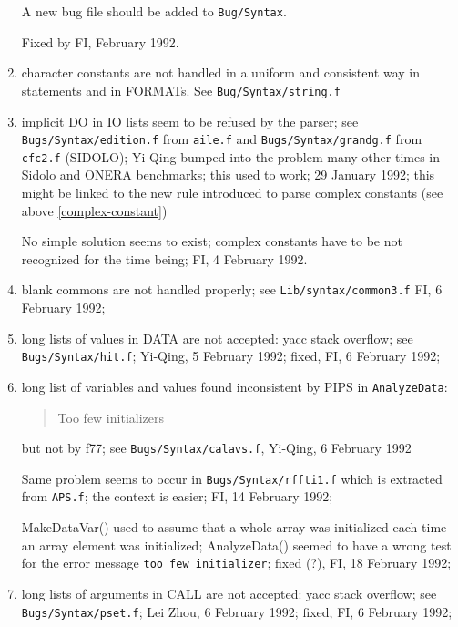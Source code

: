 \begin{enumerate}
        A new bug file should be added to \verb+Bug/Syntax+.

        Fixed by FI, February 1992.

  \item character constants are not handled in a uniform and consistent
        way in statements and in FORMATs. See \verb+Bug/Syntax/string.f+

  \item \label{implicit-do}
        implicit DO in IO lists seem to be refused by the parser; see
        \verb+Bugs/Syntax/edition.f+ from \verb+aile.f+ and
        \verb+Bugs/Syntax/grandg.f+ from \verb+cfc2.f+ (SIDOLO);
        Yi-Qing bumped into the problem many other times in Sidolo
        and ONERA benchmarks; this used to work; 29 January 1992;
        this might be linked to the new rule introduced to parse
        complex constants (see above \ref{complex-constant})

        No simple solution seems to exist; complex constants have
        to be not recognized for the time being; FI, 4 February 1992.

  \item blank commons are not handled properly; see \verb+Lib/syntax/common3.f+
        FI, 6 February 1992;

  \item long lists of values in DATA are not accepted: yacc stack overflow;
        see \verb+Bugs/Syntax/hit.f+; Yi-Qing, 5 February 1992;
        fixed, FI, 6 February 1992;

  \item long list of variables and values found inconsistent by PIPS in
        \verb+AnalyzeData+:
        \begin{quote}
        Too few initializers
        \end{quote}
        but not by f77; see \verb+Bugs/Syntax/calavs.f+, Yi-Qing,
        6 February 1992

        Same problem seems to occur in \verb+Bugs/Syntax/rffti1.f+ which
        is extracted from \verb+APS.f+; the context is easier;
        FI, 14 February 1992;

        MakeDataVar() used to assume that a whole array was initialized
        each time an array element was initialized; AnalyzeData() seemed
        to have a wrong test for the error message \verb+too few initializer+;
        fixed (?), FI, 18 February 1992;

  \item long lists of arguments in CALL are not accepted: yacc stack overflow;
        see \verb+Bugs/Syntax/pset.f+; Lei Zhou, 6 February 1992;
        fixed, FI, 6 February 1992;


\end{enumerate}
